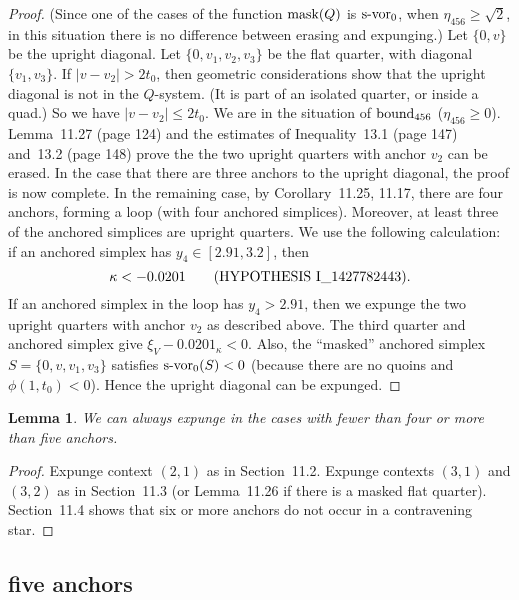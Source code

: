 \documentclass[11pt]{amsart}
\def\op#1{{\text{#1}}}
\def\text{\hbox}
\newtheorem{lemma}[subsubsection]{Lemma}
\begin{document}
\begin{proof}
  (Since one of the cases of
the function $\op{mask}(Q)$ is $\op{s-vor}_0$, when
$\eta_{456}\ge\sqrt2$, in this situation there is no difference between erasing and expunging.) Let $\{0,v\}$ be the upright
diagonal.  Let $\{0,v_1,v_2,v_3\}$ be the flat quarter, with
diagonal $\{v_1,v_3\}$.  If $|v-v_2|>2t_0$, then geometric
considerations show that the upright diagonal is not in the
$Q$-system.  (It is part of an isolated quarter, or inside
a quad.)  So we have $|v-v_2|\le 2t_0$.  We are in the situation of
$\op{bound}_{456}$ ($\eta_{456}\ge0$).  
Lemma~11.27 (page 124) and the estimates
of Inequality~13.1 (page 147) and~13.2 (page 148)
prove the the two upright quarters with anchor $v_2$ can
be erased.  In the case that there are three anchors to the upright diagonal, the proof is now complete.  In the remaining case, by Corollary~11.25, 11.17, there are four anchors, forming a loop (with four anchored simplices).  Moreover, at least three of the anchored simplices are upright quarters.  We use the following
calculation: if an anchored simplex has $y_4\in [2.91,3.2]$, then
\begin{equation}\label{eqn:0201}
 \kappa < -0.0201\qquad\text{(HYPOTHESIS I\_1427782443)}.
\end{equation}
If an anchored simplex
in the loop has $y_4> 2.91$, then we expunge the two upright quarters with anchor $v_2$ as described above. The third quarter and
anchored simplex give
  $\xi_V - 0.0201_\kappa < 0$.
Also, the ``masked''
anchored simplex $S=\{0,v,v_1,v_3\}$ satisfies $\op{s-vor}_0(S) <0$
(because there are no quoins and $\phi(1,t_0)<0$).
Hence the upright diagonal can be expunged.
\end{proof}


\begin{lemma}
We can always expunge in the cases with fewer than four or more than five anchors.
\end{lemma}

\begin{proof}
Expunge context $(2,1)$ as in Section~11.2.  Expunge contexts $(3,1)$ and $(3,2)$
as in Section~11.3 (or Lemma~11.26 if there is a masked flat
quarter).  Section~11.4 shows that six or more anchors do not
occur in a contravening star.  
\end{proof}

\subsection{five anchors}
\end{document}

